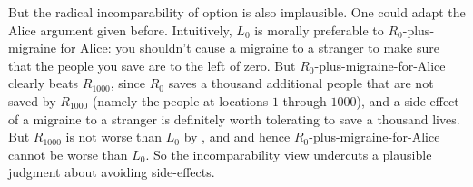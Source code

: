 But the radical incomparability of option  is also implausible. One could adapt
the Alice argument given before. Intuitively, $L_0$ is morally preferable to $R_0$-plus-migraine for
Alice: you shouldn't cause a migraine to a stranger to make sure that the people you save are to 
the left of zero. But $R_0$-plus-migraine-for-Alice clearly beats $R_{1000}$, since 
$R_{0}$ saves a thousand additional people that are not saved by $R_{1000}$ (namely the people at 
locations $1$ through $1000$), and a side-effect of a migraine to a stranger is definitely worth 
tolerating to save a thousand lives. But $R_{1000}$ is not worse than $L_0$ by ,
and and hence $R_0$-plus-migraine-for-Alice cannot be worse than $L_0$. So the incomparability view 
undercuts a plausible judgment about avoiding side-effects.




